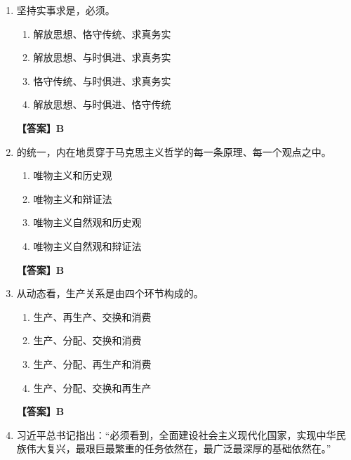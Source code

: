 \documentclass[UTF8,11pt,a4paper]{ctexart}
\begin{document}
\begin{enumerate}[label=\textbf{\arabic*.}, leftmargin=2.5em, itemsep=0.7em]
\begin{enumerate}[label=\Alph*., leftmargin=2em, itemsep=0.1em, topsep=0.15em]
\item 社会主义市场经济规律 集成性
\item 社会主义经济建设规律 原创性
\item 社会主义市场经济规律 原创性
\end{enumerate}
\textbf{【答案】C}
\item 坚持实事求是，必须\allowbreak\underline{\hspace{4em}}。
\begin{enumerate}[label=\Alph*., leftmargin=2em, itemsep=0.1em, topsep=0.15em]
\item 解放思想、恪守传统、求真务实
\item 解放思想、与时俱进、求真务实
\item 恪守传统、与时俱进、求真务实
\item 解放思想、与时俱进、恪守传统
\end{enumerate}
\textbf{【答案】B}
\item \allowbreak\underline{\hspace{4em}}的统一，内在地贯穿于马克思主义哲学的每一条原理、每一个观点之中。
\begin{enumerate}[label=\Alph*., leftmargin=2em, itemsep=0.1em, topsep=0.15em]
\item 唯物主义和历史观
\item 唯物主义和辩证法
\item 唯物主义自然观和历史观
\item 唯物主义自然观和辩证法
\end{enumerate}
\textbf{【答案】B}
\item 从动态看，生产关系是由\allowbreak\underline{\hspace{4em}}四个环节构成的。
\begin{enumerate}[label=\Alph*., leftmargin=2em, itemsep=0.1em, topsep=0.15em]
\item 生产、再生产、交换和消费
\item 生产、分配、交换和消费
\item 生产、分配、再生产和消费
\item 生产、分配、交换和再生产
\end{enumerate}
\textbf{【答案】B}
\item 习近平总书记指出：“必须看到，全面建设社会主义现代化国家，实现中华民族伟大复兴，最艰巨最繁重的任务依然在\allowbreak\underline{\hspace{4em}}，最广泛最深厚的基础依然在\allowbreak\underline{\hspace{4em}}。”
\begin{enumerate}[label=\Alph*., leftmargin=2em, itemsep=0.1em, topsep=0.15em]

\end{enumerate}
\end{enumerate}
\end{document}
